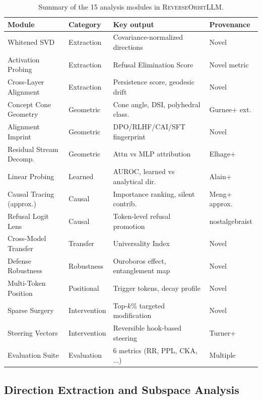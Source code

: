 \documentclass[11pt]{article}
\begin{document}
\begin{table}[t]
\centering
\caption{Summary of the 15 analysis modules in \textsc{ReverseOrbitLLM}.}
\label{tab:modules}
\small
\begin{tabular}{@{}llll@{}}
\toprule
\textbf{Module} & \textbf{Category} & \textbf{Key output} & \textbf{Provenance} \\
\midrule
Whitened SVD & Extraction & Covariance-normalized directions & Novel \\
Activation Probing & Extraction & Refusal Elimination Score & Novel metric \\
Cross-Layer Alignment & Extraction & Persistence score, geodesic drift & Novel \\
\midrule
Concept Cone Geometry & Geometric & Cone angle, DSI, polyhedral class. & Gurnee+ ext. \\
Alignment Imprint & Geometric & DPO/RLHF/CAI/SFT fingerprint & Novel \\
Residual Stream Decomp. & Geometric & Attn vs MLP attribution & Elhage+ \\
\midrule
Linear Probing & Learned & AUROC, learned vs analytical dir. & Alain+ \\
Causal Tracing (approx.) & Causal & Importance ranking, silent contrib. & Meng+ approx. \\
Refusal Logit Lens & Causal & Token-level refusal promotion & nostalgebraist \\
\midrule
Cross-Model Transfer & Transfer & Universality Index & Novel \\
Defense Robustness & Robustness & Ouroboros effect, entanglement map & Novel \\
Multi-Token Position & Positional & Trigger tokens, decay profile & Novel \\
\midrule
Sparse Surgery & Intervention & Top-$k$\% targeted modification & Novel \\
Steering Vectors & Intervention & Reversible hook-based steering & Turner+ \\
\midrule
Evaluation Suite & Evaluation & 6 metrics (RR, PPL, CKA, ...) & Multiple \\
\bottomrule
\end{tabular}
\end{table}

\subsection{Direction Extraction and Subspace Analysis}
\end{document}
